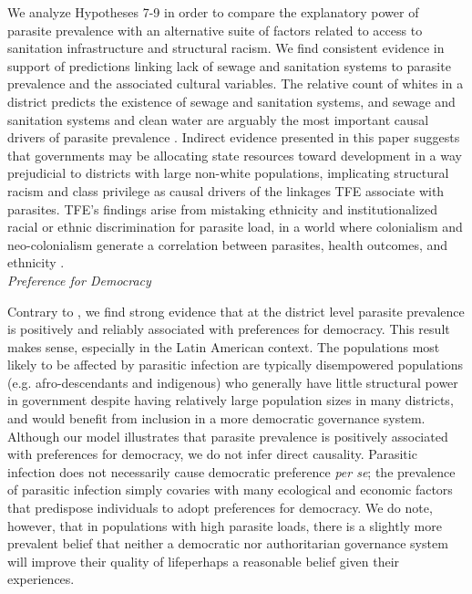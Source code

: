 \documentclass[12pt]{article}
\begin{document}
	We analyze Hypotheses 7-9 in order to compare the explanatory power of parasite prevalence with an alternative suite of factors related to access to sanitation infrastructure and structural racism.  We find consistent evidence in support of predictions linking lack of sewage and sanitation systems to parasite prevalence and the associated cultural variables. The relative count of whites in a district predicts the existence of sewage and sanitation systems, and sewage and sanitation systems and clean water are arguably the most important causal drivers of parasite prevalence \citep{Jongwook2004}.  Indirect evidence presented in this paper suggests that governments may be allocating state resources toward development in a way prejudicial to districts with large non-white populations, implicating structural racism and class privilege as causal drivers of the linkages TFE associate with parasites. TFE's findings arise from mistaking ethnicity and institutionalized racial or ethnic discrimination for parasite load, in a world where colonialism and neo-colonialism generate a correlation between parasites, health outcomes, and ethnicity \citep{better2008institutional, anderson2000gender}.	\\

\noindent\textit{Preference for Democracy}

Contrary to \citet{Thornhill2009}, we find strong evidence that at the district level parasite prevalence is positively and reliably associated with preferences for democracy. This result makes sense, especially in the Latin American context. The populations most likely to be affected by parasitic infection are typically disempowered populations (e.g. afro-descendants and indigenous) who generally have little structural power in government despite having relatively large population sizes in many districts, and would benefit from inclusion in a more democratic governance system. Although our model illustrates that parasite prevalence is positively associated with preferences for democracy, we do not infer direct causality. Parasitic infection does not necessarily cause democratic preference \textit{per se}; the prevalence of parasitic infection simply covaries with many ecological and economic factors that predispose individuals to adopt preferences for democracy. We do note, however, that in populations with high parasite loads, there is a slightly more prevalent belief that neither a democratic nor authoritarian governance system will improve their quality of life\textemdash perhaps a reasonable belief given their experiences. 
	
\end{document}
